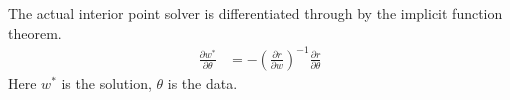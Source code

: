 \documentclass[book.tex]{subfiles}
\begin{document}
The actual interior point solver is differentiated through by the implicit function theorem.
\begin{align}
\frac{\partial w^*}{\partial \theta} &= - \left (\frac{\partial r}{\partial w}\right )^{-1} \frac{\partial r}{\partial \theta}
\end{align}
Here $w^*$ is the solution, $\theta$ is the data. %




\end{document}
